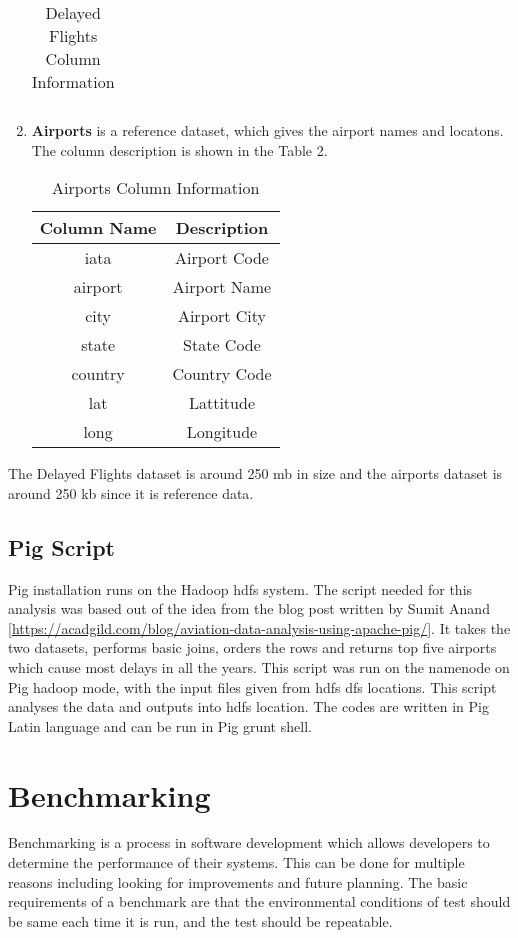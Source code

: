 \documentclass[9pt,twocolumn,twoside]{../../styles/osajnl}
\begin{document}
\begin{enumerate}
\begin{table}
\begin{tabular}{|c|c|}
    \end{tabular}
    \caption{Delayed Flights Column Information}
    \end{table}
    \item \textbf{Airports} is a reference dataset, which gives the airport names and locatons. The column description is shown in the Table 2.
    
    \begin{table}
    \begin{tabular}{|c|c|}
        \hline
        \textbf{Column Name} & \textbf{Description} \\ \hline
        iata & Airport Code  \\ \hline
        airport & Airport Name  \\ \hline
        city & Airport City  \\ \hline
        state & State Code  \\ \hline
        country & Country Code  \\ \hline
        lat & Lattitude  \\ \hline
    long & Longitude  \\ \hline
    \end{tabular}
    \caption{Airports Column Information}
    \end{table}
    
\end{enumerate}
The Delayed Flights dataset is around 250 mb in size and the airports dataset is around 250 kb since it is reference data.
\subsection{Pig Script}
Pig installation runs on the Hadoop hdfs system. The script needed for this analysis was based out of the idea from the blog post written by Sumit Anand [\url{https://acadgild.com/blog/aviation-data-analysis-using-apache-pig/}]. It takes the two datasets, performs basic joins, orders the rows and returns top five airports which cause most delays in all the years. This script was run on the namenode on Pig hadoop mode, with the input files given from hdfs dfs locations. This script analyses the data and outputs into hdfs location. The codes are written in Pig Latin language and can be run in Pig grunt shell. 

\section{Benchmarking}
Benchmarking is a process in software development which allows developers to determine the performance of their systems. This can be done for multiple reasons including looking for improvements and future planning. The basic requirements of a benchmark are that the environmental conditions of test should be same each time it is run, and the test should be repeatable. 
\end{document}
